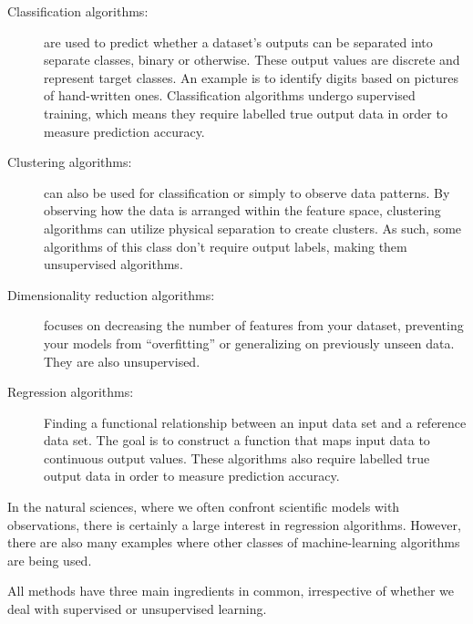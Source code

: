\documentclass[%
oneside,                 %
final,                   %
10pt]{article}
\begin{document}
\begin{description}
\item[Classification algorithms:] 
  are used to predict whether a dataset’s outputs can be separated into separate classes, binary or otherwise. These output values are discrete and represent target classes. An example is to identify  digits based on pictures of hand-written ones. Classification algorithms undergo supervised training, which means they require labelled true output data in order to measure prediction accuracy.
\end{description}

\noindent
\begin{description}
\item[Clustering algorithms:] 
  can also be used for classification or simply to observe data patterns. By observing how the data is arranged within the feature space, clustering algorithms can utilize physical separation to create clusters. As such, some algorithms of this class don’t require output labels, making them unsupervised algorithms.
\end{description}

\noindent
\begin{description}
\item[Dimensionality reduction algorithms:] 
  focuses on decreasing the number of features from your dataset, preventing your models from “overfitting” or generalizing on previously unseen data. They are also unsupervised.
\end{description}

\noindent
\begin{description}
\item[Regression algorithms:] 
  Finding a functional relationship between an input data set and a reference data set. The goal is to construct a function that maps input data to continuous output values. These algorithms also require labelled true output data in order to measure prediction accuracy.
\end{description}

\noindent
In the natural sciences, where we often confront scientific models with observations, there is certainly a large interest in regression algorithms. However, there are also many examples where other classes of machine-learning algorithms are being used.

All methods have three main ingredients in common, irrespective of whether we deal with supervised or unsupervised learning. 
\end{document}
